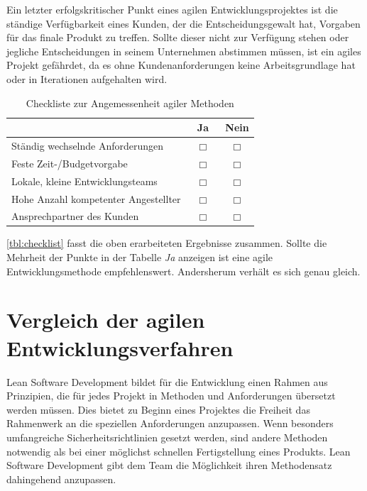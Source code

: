         Ein letzter erfolgskritischer Punkt eines agilen Entwicklungsprojektes ist die ständige Verfügbarkeit eines Kunden, der die Entscheidungsgewalt hat, Vorgaben für das finale Produkt zu treffen. Sollte dieser nicht zur Verfügung stehen oder jegliche Entscheidungen in seinem Unternehmen abstimmen müssen, ist ein agiles Projekt gefährdet, da es ohne Kundenanforderungen keine Arbeitsgrundlage hat oder in Iterationen aufgehalten wird.

        \begin{table}
        \begin{tabularx}{\textwidth}{|X|c|c|}
          \hline
           & $\mbox{ }$Ja$\mbox{ }$ & Nein \\
          \hline
          Ständig wechselnde Anforderungen & $\Box$ & $\Box$ \\
          Feste Zeit-/Budgetvorgabe & $\Box$ & $\Box$ \\
          Lokale, kleine Entwicklungsteams & $\Box$ & $\Box$ \\
          Hohe Anzahl kompetenter Angestellter & $\Box$ & $\Box$ \\
          Ansprechpartner des Kunden & $\Box$ & $\Box$ \\
          \hline
        \end{tabularx}
        \caption{Checkliste zur Angemessenheit agiler Methoden}
        \label{tbl:checklist}
        \end{table}

        \autoref{tbl:checklist} fasst die oben erarbeiteten Ergebnisse zusammen. Sollte die Mehrheit der Punkte in der Tabelle \emph{Ja} anzeigen ist eine agile Entwicklungsmethode empfehlenswert. Andersherum verhält es sich genau gleich.

    \section{Vergleich der agilen Entwicklungsverfahren}

        Lean Software Development bildet für die Entwicklung einen Rahmen aus Prinzipien, die für jedes Projekt in Methoden und Anforderungen übersetzt werden müssen. Dies bietet zu Beginn eines Projektes die Freiheit das Rahmenwerk an die speziellen Anforderungen anzupassen. Wenn besonders umfangreiche Sicherheitsrichtlinien gesetzt werden, sind andere Methoden notwendig als bei einer möglichst schnellen Fertigstellung eines Produkts. Lean Software Development gibt dem Team die Möglichkeit ihren Methodensatz dahingehend anzupassen.

